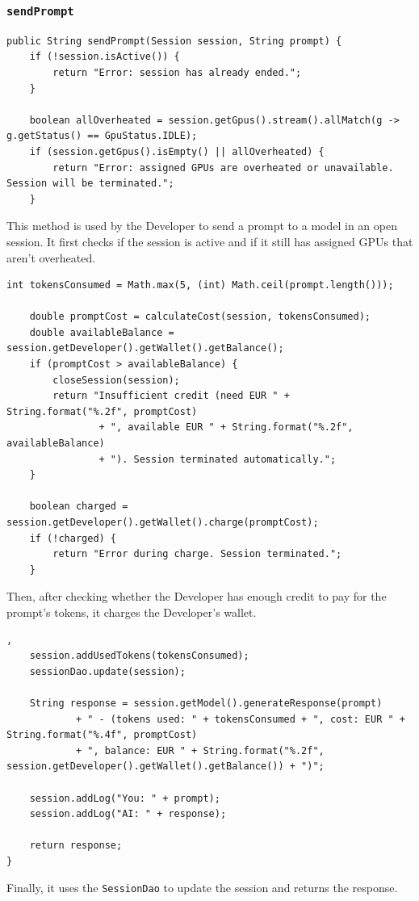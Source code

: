 \documentclass[a4paper,11pt]{report}
\begin{document}
\subsubsection{\texttt{sendPrompt}}
\begin{lstlisting}[label={lst:sendprompt1}, firstnumber=34]
public String sendPrompt(Session session, String prompt) {
    if (!session.isActive()) {
        return "Error: session has already ended.";
    }

    boolean allOverheated = session.getGpus().stream().allMatch(g -> g.getStatus() == GpuStatus.IDLE);
    if (session.getGpus().isEmpty() || allOverheated) {
        return "Error: assigned GPUs are overheated or unavailable. Session will be terminated.";
    }
\end{lstlisting}
This method is used by the Developer to send a prompt to a model in an open session. 
It first checks if the session is active and if it still has assigned GPUs that aren't overheated.

\begin{lstlisting}[label={lst:sendprompt2}, firstnumber=44]
    int tokensConsumed = Math.max(5, (int) Math.ceil(prompt.length()));

    double promptCost = calculateCost(session, tokensConsumed);
    double availableBalance = session.getDeveloper().getWallet().getBalance();
    if (promptCost > availableBalance) {
        closeSession(session);
        return "Insufficient credit (need EUR " + String.format("%.2f", promptCost)
                + ", available EUR " + String.format("%.2f", availableBalance)
                + "). Session terminated automatically.";
    }

    boolean charged = session.getDeveloper().getWallet().charge(promptCost);
    if (!charged) {
        return "Error during charge. Session terminated.";
    }
\end{lstlisting}

Then, after checking whether the Developer has enough credit to pay for the prompt's tokens, it charges the Developer's wallet. 

\begin{lstlisting}[label={lst:sendprompt3}, firstnumber=60],
    session.addUsedTokens(tokensConsumed);
    sessionDao.update(session);

    String response = session.getModel().generateResponse(prompt)
            + " - (tokens used: " + tokensConsumed + ", cost: EUR " + String.format("%.4f", promptCost)
            + ", balance: EUR " + String.format("%.2f", session.getDeveloper().getWallet().getBalance()) + ")";

    session.addLog("You: " + prompt);
    session.addLog("AI: " + response);

    return response;
}
\end{lstlisting}
Finally, it uses the \texttt{SessionDao} to update the session and returns the response.
\end{document}

